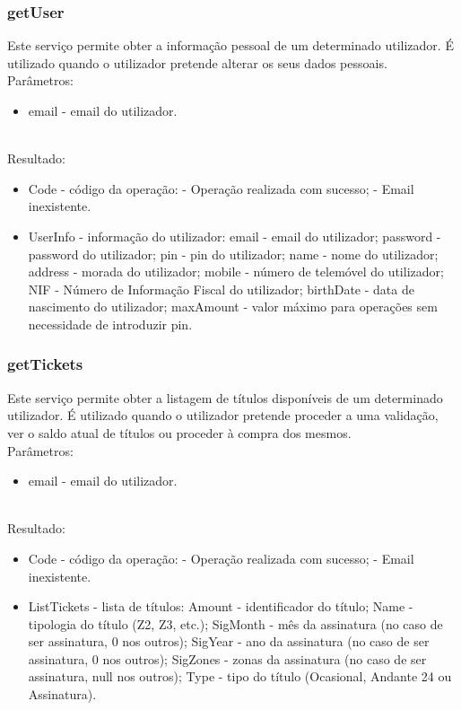 \subsubsection{getUser}

Este serviço permite obter a informação pessoal de um determinado utilizador. É utilizado quando o utilizador pretende alterar os seus dados pessoais.
\newline
~\\Parâmetros:
\begin{itemize}
\item email - email do utilizador.
\end{itemize}

~\\Resultado:
\begin{itemize}
\item Code - código da operação:
 - Operação realizada com sucesso;
 - Email inexistente.
\item UserInfo - informação do utilizador:
\subitem email - email do utilizador;
\subitem password - password do utilizador;
\subitem pin - pin do utilizador;
\subitem name - nome do utilizador;
\subitem address - morada do utilizador;
\subitem mobile - número de telemóvel do utilizador;
\subitem NIF - Número de Informação Fiscal do utilizador;
\subitem birthDate - data de nascimento do utilizador;
\subitem maxAmount - valor máximo para operações sem necessidade de introduzir pin.
\end{itemize}

\subsubsection{getTickets}

Este serviço permite obter a listagem de títulos disponíveis de um determinado utilizador. É utilizado quando o utilizador pretende proceder a uma validação, ver o saldo atual de títulos ou proceder à compra dos mesmos.
\newline
~\\Parâmetros:
\begin{itemize}
\item email - email do utilizador.
\end{itemize}

~\\Resultado:
\begin{itemize}
\item Code - código da operação:
 - Operação realizada com sucesso;
 - Email inexistente.
\item ListTickets - lista de títulos:
\subitem Amount - identificador do título;
\subitem Name - tipologia do título (Z2, Z3, etc.);
\subitem SigMonth - mês da assinatura (no caso de ser assinatura, 0 nos outros);
\subitem SigYear - ano da assinatura (no caso de ser assinatura, 0 nos outros);
\subitem SigZones - zonas da assinatura (no caso de ser assinatura, null nos outros);
\subitem Type - tipo do título (Ocasional, Andante 24 ou Assinatura).
\end{itemize}


